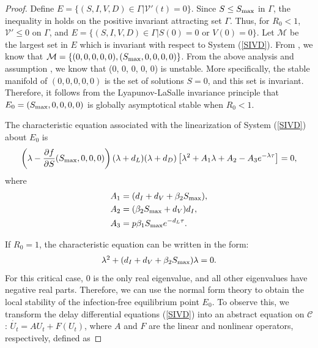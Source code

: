 \documentclass{CMHPhD-SIVD}
\begin{document}
\begin{proof}
Define $E=\{(S, I, V, D)\in \Gamma |\mathcal{V}'(t)=0\}$.	Since $S\leq S_{\text{max}}$ in $\Gamma$, the inequality in  holds on the positive invariant attracting set $\Gamma$. Thus, for $R_0 < 1$, $\mathcal{V}' \le 0$ on $\Gamma$, and
	$E=\{(S, I, V, D)\in \Gamma|S(0)=0 \text{ or } V(0)=0\}$. Let $\mathcal{M}$ be the largest set in $E$ which is invariant with respect to System (\ref{SIVD}). From , we know that $\mathcal{M}=\{(0, 0, 0, 0, 0),(S_{\text{max}}, 0, 0, 0, 0)\}$.
	From the above analysis and assumption , we know that (0, 0, 0, 0, 0) is unstable. More specifically,  the stable manifold of $(0,0,0,0,0)$ is the set of solutions $S=0$, and this set is invariant.  Therefore, it follows from the Lyapunov-LaSalle invariance principle\cite{hale1993introduction} that $E_0=(S_{\text{max}}, 0, 0, 0, 0)$ is globally asymptotical stable when $R_0<1$.



The characteristic equation associated with the linearization of System (\ref{SIVD}) about $E_0$ is
\begin{equation}\label{4}
	\left(\lambda-\frac{\partial f}{\partial S} (S_{\text{max}}, 0, 0, 0)\right)(\lambda+d_L)(\lambda+d_D)\left[\lambda^2+A_1\lambda+A_2-A_3e^{-\lambda\tau}\right]=0,
\end{equation}
where
\begin{align*}
&A_1=(d_I+d_V+\beta_2 S_{\text{max}}),\\
&A_2=(\beta_2 S_{\text{max}}+d_V)d_I,\\
&A_3=p\beta_1 S_{\text{max}} e^{-d_L\tau}.
\end{align*}



If $R_0=1$, the characteristic equation  can be written in the form:
\begin{equation}\label{25}
   \begin{array}{ll}
     \lambda^2+(d_I+d_V+\beta_2 S_{\text{max}})\lambda=0.
   \end{array}
\end{equation}
For this critical case, 0 is the only real eigenvalue, and all other eigenvalues have negative real parts. Therefore, we can use the normal form theory \cite{faria2000normal,hassard1981theory} to obtain the local stability of the infection-free equilibrium point $E_0$. To observe this, we transform the delay differential equations (\ref{SIVD}) into an abstract equation on $\mathcal{C}$: $\dot{U_t}=AU_t+F(U_t)$, where $A$ and $F$ are the linear and nonlinear operators, respectively, defined as


\end{proof}
\end{document}
